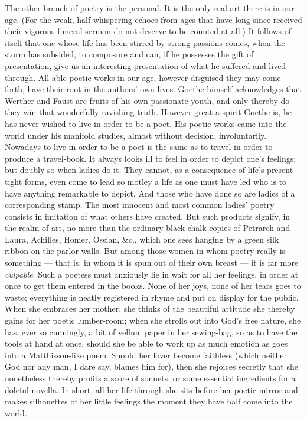 \documentclass[12pt]{article}
\newcommand{\opage}[1]{\marginnote{\footnotesize\textit{[#1]}}}
\begin{document}
The other branch of poetry is the personal. It is the only real art there is in our
age. (For the weak, half-whispering echoes from ages that have long since received
their vigorous funeral sermon do not deserve to be counted at all.) It follows of
itself that one whose life has been stirred by strong passions comes, when the
storm has subsided, to composure and can, \opage{12}if he possesses the gift of
presentation, give us an interesting presentation of what he suffered and lived
through. All able poetic works in our age, however disguised they may come forth,
have their root in the authors' own lives. Goethe himself acknowledges that Werther
and Faust are fruits of his own passionate youth, and only thereby do they win that
wonderfully ravishing truth. However great a spirit Goethe is, he has never wished
to live in order to be a poet. His poetic works came into the world under his
manifold studies, almost without decision, involuntarily. Nowadays to live in order
to be a poet is the same as to travel in order to produce a travel-book. It always
looks ill to feel in order to depict one's feelings; but doubly so when ladies do
it. They cannot, as a consequence of life's present tight forms, even come to lead
so motley a life as one must have led who is to have anything remarkable to depict.
And those who have done so are ladies of a corresponding stamp. The most innocent
and most common ladies' poetry consists in imitation of what others have created.
But such products signify, in the realm of art, no more than the ordinary
black-chalk copies of Petrarch and Laura, Achilles, Homer, Ossian, \&c., which one
sees hanging by a green silk ribbon on the parlor walls. But among those women in
whom poetry really is something --- that is, in whom it is spun out of their own
breast --- it is far more \emph{culpable}. Such a poetess must anxiously lie in wait
for all her feelings, in order at once to get them entered in the books. None of
her joys, none of her tears goes to waste; everything is neatly registered in rhyme
and put on display for the public. When she embraces her mother, she thinks of the
beautiful attitude she thereby gains for her poetic lumber-room; when she strolls
out into God's free nature, she has, ever so cunningly, a bit of vellum paper in her
sewing-bag, so as to have the tools at hand at once, should she be able to work up
as much emotion as goes \opage{13}into a Matthisson-like poem. Should her lover
become faithless (which neither God nor any man, I dare say, blames him for), then
she rejoices secretly that she nonetheless thereby profits a score of sonnets, or
some essential ingredients for a doleful novella. In short, all her life through she
sits before her poetic mirror and makes silhouettes of her little feelings the
moment they have half come into the world.
\end{document}
